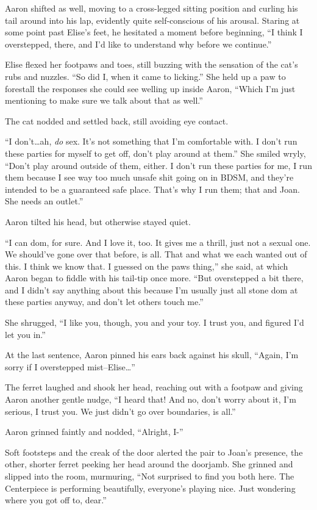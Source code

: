 Aaron shifted as well, moving to a cross-legged sitting position and curling his tail around into his lap, evidently quite self-conscious of his arousal. Staring at some point past Elise's feet, he hesitated a moment before beginning, ``I think I overstepped, there, and I'd like to understand why before we continue.''

Elise flexed her footpaws and toes, still buzzing with the sensation of the cat's rubs and nuzzles. ``So did I, when it came to licking.'' She held up a paw to forestall the responses she could see welling up inside Aaron, ``Which I'm just mentioning to make sure we talk about that as well.''

The cat nodded and settled back, still avoiding eye contact.

``I don't\ldots{}ah, \emph{do} sex. It's not something that I'm comfortable with. I don't run these parties for myself to get off, don't play around at them.'' She smiled wryly, ``Don't play around outside of them, either. I don't run these parties for me, I run them because I see way too much unsafe shit going on in BDSM, and they're intended to be a guaranteed safe place. That's why I run them; that and Joan. She needs an outlet.''

Aaron tilted his head, but otherwise stayed quiet.

``I can dom, for sure. And I love it, too. It gives me a thrill, just not a sexual one. We should've gone over that before, is all. That and what we each wanted out of this. I think we know that. I guessed on the paws thing,'' she said, at which Aaron began to fiddle with his tail-tip once more. ``But overstepped a bit there, and I didn't say anything about this because I'm usually just all stone dom at these parties anyway, and don't let others touch me.''

She shrugged, ``I like you, though, you and your toy. I trust you, and figured I'd let you in.''

At the last sentence, Aaron pinned his ears back against his skull, ``Again, I'm sorry if I overstepped mist--Elise\ldots{}''

The ferret laughed and shook her head, reaching out with a footpaw and giving Aaron another gentle nudge, ``I heard that! And no, don't worry about it, I'm serious, I trust you. We just didn't go over boundaries, is all.''

Aaron grinned faintly and nodded, ``Alright, I-''

Soft footsteps and the creak of the door alerted the pair to Joan's presence, the other, shorter ferret peeking her head around the doorjamb. She grinned and slipped into the room, murmuring, ``Not surprised to find you both here. The Centerpiece is performing beautifully, everyone's playing nice. Just wondering where you got off to, dear.''

